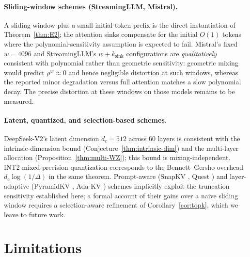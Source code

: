 \documentclass[11pt]{article}
\theoremstyle{plain}
\theoremstyle{definition}
\theoremstyle{remark}
\begin{document}
\paragraph{Sliding-window schemes (StreamingLLM, Mistral).}
A sliding window plus a small initial-token prefix
\citep{xiao2024efficient} is the direct instantiation of
Theorem~\ref{thm:E2}; the attention sinks compensate for the initial
$O(1)$ tokens where the polynomial-sensitivity assumption is expected
to fail. Mistral's fixed $w = 4096$ \citep{jiang2023mistral7b} and
StreamingLLM's $w + k_{\mathrm{sink}}$ configurations are
\emph{qualitatively} consistent with polynomial rather than geometric
sensitivity: geometric mixing would predict $\rho^{w} \approx 0$ and
hence negligible distortion at such windows, whereas the reported
minor degradation versus full attention matches a slow polynomial
decay. The precise distortion at these windows on those models
remains to be measured.

\paragraph{Latent, quantized, and selection-based schemes.}
DeepSeek-V2's latent dimension $d_c = 512$ across $60$ layers
\citep{deepseek2024mla} is consistent with the intrinsic-dimension
bound (Conjecture~\ref{thm:intrinsic-dim}) and the multi-layer
allocation (Proposition~\ref{thm:multi-WZ}); this bound is
mixing-independent. INT2 mixed-precision quantization
\citep{liu2024kivi,kang2024gear} corresponds to the Bennett--Gersho
overhead $d_c \log(1/\Delta)$ in the same theorem. Prompt-aware
(SnapKV \citep{li2024snapkv}, Quest \citep{tang2024quest}) and
layer-adaptive (PyramidKV \citep{cai2024pyramidkv}, Ada-KV
\citep{feng2024adakv}) schemes implicitly exploit the truncation
sensitivity established here; a formal account of their gains over a
naive sliding window requires a selection-aware refinement of
Corollary~\ref{cor:topk}, which we leave to future work.

\section{Limitations}
\label{sec:limitations}
\end{document}
